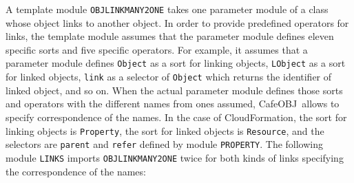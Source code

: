 \documentclass[12pt]{report}
\newcommand{\cafeobj}{{\sf CafeOBJ}~}
\begin{document}
A template module {\tt OBJLINKMANY2ONE} takes one parameter module of
a class whose object links to another object. In order to provide
predefined operators for links, the template module assumes that the
parameter module defines eleven specific sorts and five specific
operators. For example, it assumes that a parameter module defines
{\tt Object} as a sort for linking objects, {\tt LObject} as a sort
for linked objects, {\tt link} as a selector of {\tt Object} which
returns the identifier of linked object, and so on. When the actual
parameter module defines those sorts and operators with the different
names from ones assumed, \cafeobj allows to specify correspondence of
the names. In the case of CloudFormation, the sort for linking objects
is {\tt Property}, the sort for linked objects is {\tt Resource}, and
the selectors are {\tt parent} and {\tt refer} defined by module
{\tt PROPERTY}.  The following module {\tt LINKS} imports
{\tt OBJLINKMANY2ONE} twice for both kinds of links specifying the
correspondence of the names:
\small
\end{document}
